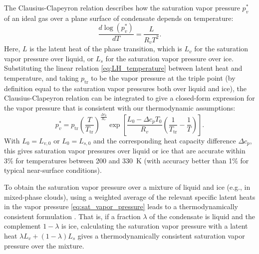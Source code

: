 \documentclass{report}
\begin{document}
The Clausius-Clapeyron relation describes how the saturation vapor pressure $p_v^*$ of an ideal gas over a plane surface of condensate depends on temperature:
\begin{equation}\label{e:Clausius_Clapeyron}
    \frac{d \log(p_v^*)}{dT} = \frac{L}{R_v T^2}.
\end{equation}
Here, $L$ is the latent heat of the phase transition, which is $L_v$ for the saturation vapor pressure over liquid, or $L_s$ for the saturation vapor pressure over ice. Substituting the linear relation \eqref{eq:LH_temperature} between latent heat and temperature, and taking $p_\mathrm{tr}$ to be the vapor pressure at the triple point (by definition equal to the saturation vapor pressures both over liquid and ice), the Clausius-Clapeyron relation can be integrated to give a closed-form expression for the vapor pressure that is consistent with our thermodynamic assumptions:
\begin{equation}
    p_v^* = p_{\mathrm{tr}} \left( \frac{T}{T_{\mathrm{tr}}} \right)^{\frac{\Delta c_p}{R_v}}
        \exp \left[ \frac{L_0 - \Delta c_p T_0}{R_v} 
        \left( \frac{1}{T_{\mathrm{tr}}} - \frac{1}{T} \right) \right].
        \label{eq:sat_vapor_pressure}
\end{equation}
With $L_0 = L_{v,0}$ or $L_0 = L_{s,0}$ and the corresponding heat capacity difference $\Delta c_p$, this gives saturation vapor pressures over liquid or ice that are accurate within 3\% for temperatures between 200 and 330~K (with accuracy better than 1\% for typical near-surface conditions).

To obtain the saturation vapor pressure over a mixture of liquid and ice (e.g., in mixed-phase clouds), using a weighted average of the relevant specific latent heats in the vapor pressure \eqref{eq:sat_vapor_pressure} leads to a thermodynamically consistent formulation \citep{Pressel15a}. That is, if a fraction $\lambda$ of the condensate is liquid and the complement $1-\lambda$ is ice, calculating the saturation vapor pressure with a latent heat $\lambda L_v + (1-\lambda)L_s$ gives a thermodynamically consistent saturation vapor pressure over the mixture. 
\end{document}
